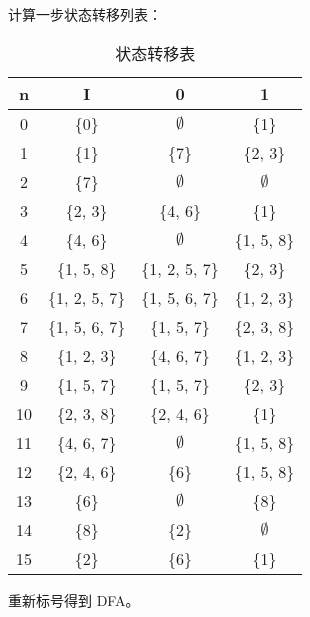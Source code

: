 \documentclass{ctexart}
\begin{document}
\begin{enumerate}
\begin{itemize}
        计算一步状态转移列表：
        
        \begin{table}[H]
            \centering
            \begin{tabular}{|c|c|c|c|}
                \hline
                n & I & 0 & 1 \\
                \hline
                0 & \{0\} & $\emptyset$ & \{1\} \\
                \hline
                1 & \{1\} & \{7\} & \{2, 3\} \\
                \hline
                2 & \{7\} & $\emptyset$ & $\emptyset$ \\
                \hline
                3 & \{2, 3\} & \{4, 6\} & \{1\} \\
                \hline
                4 & \{4, 6\} & $\emptyset$ & \{1, 5, 8\} \\
                \hline
                5 & \{1, 5, 8\} & \{1, 2, 5, 7\} & \{2, 3\} \\
                \hline
                6 & \{1, 2, 5, 7\} & \{1, 5, 6, 7\} & \{1, 2, 3\} \\
                \hline
                7 & \{1, 5, 6, 7\} & \{1, 5, 7\} & \{2, 3, 8\} \\
                \hline
                8 & \{1, 2, 3\} & \{4, 6, 7\} & \{1, 2, 3\} \\
                \hline
                9 & \{1, 5, 7\} & \{1, 5, 7\} & \{2, 3\} \\
                \hline
                10 & \{2, 3, 8\} & \{2, 4, 6\} & \{1\} \\
                \hline
                11 & \{4, 6, 7\} & $\emptyset$ & \{1, 5, 8\} \\
                \hline
                12 & \{2, 4, 6\} & \{6\} & \{1, 5, 8\} \\
                \hline
                13 & \{6\} & $\emptyset$ & \{8\} \\
                \hline
                14 & \{8\} & \{2\} & $\emptyset$ \\
                \hline
                15 & \{2\} & \{6\} & \{1\} \\
                \hline
            \end{tabular}
            \caption{状态转移表}
            \label{tab:2}
        \end{table}
        
        重新标号得到 DFA。
        

\end{itemize}
\end{enumerate}
\end{document}
